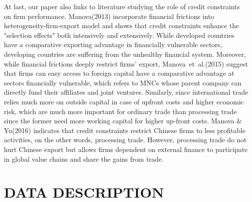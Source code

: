 \documentclass[12pt]{article}%
\begin{document}
\begin{CJK*}{GBK}{fs}
At last, our paper also links to literature studying the role of credit constraints on firm performance. \textcolor[rgb]{0.00,0.07,1.00}{Manova(2013)} incorporate financial frictions into heterogeneity-firm-export model and shows that credit constraints enhance the "selection effects" both intensively and extensively. While developed countries have a comparative exporting advantage in financially vulnerable sectors, developing countries are suffering from the unhealthy financial system. Moreover, while financial frictions deeply restrict firms' export, \textcolor[rgb]{0.00,0.07,1.00}{Manova~et~al.(2015)} suggest that firms can easy access to foreign capital have a comparative advantage at sectors financially vulnerable, which refers to MNCs whose parent company can directly fund their affiliates and joint ventures. Similarly, since international trade relies much more on outside capital in case of upfront costs and higher economic risk, which are much more important for ordinary trade than processing trade since the former need more working capital for higher up-front costs. \textcolor[rgb]{0.00,0.07,1.00}{Manova \& Yu(2016)} indicates that credit constraints restrict Chinese firms to less profitable activities, on the other words, processing trade. However, processing trade do not hurt Chinese export but allows firms dependent on external finance to participate in global value chains and share the gains from trade.


\section{DATA DESCRIPTION}

\end{CJK*}
\end{document}
